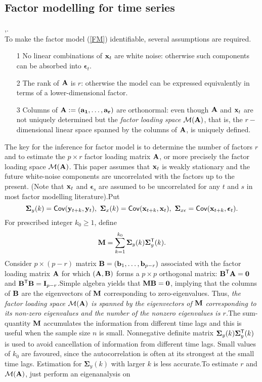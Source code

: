 \documentclass{statsoc}
\begin{document}
\subsection{Factor modelling for time series}
\citet{ly_fm12},\citet{lyb_fm11}.\\
To make the factor model (\ref{FM}) identifiable, several assumptions are required.
\begin{itemize}
\item[1] No linear combinations of ${\bf x}_t$ are white noise: otherwise such components can be absorbed into ${\bm \epsilon}_t$.
\item[2] The rank of $\bf A$ is $r$: otherwise the model can be expressed equivalently in terms of a lower-dimensional factor.
\item[3] Columns of $\bf A:=({\bf a}_1,\ldots,{\bf a}_r)$ are orthonormal: even though $\bf A$ and ${\bf x}_t$ are not uniquely determined but the {\it factor loading space} ${\cal M}({\bf A})$, that is, the $r-$dimensional linear space spanned by the columns of $\bf A$, is uniquely defined.
\end{itemize}
The key for the inference for factor model is to determine the number of factors $r$ and to estimate the $p\times r$ factor loading matrix $\bf A$, or more precisely the factor loading space ${\cal M}({\bf A})$.
This paper assumes that ${\bf x}_t$ is weakly stationary and the future white-noise components are uncorrelated with the factors up to the present. (Note that ${\bf x}_t$ and ${\bm\epsilon}_s$ are assumed to be uncorrelated for any $t$ and $s$ in most factor modelling literature).Put
\[{\bm\Sigma}_y(k)={\sf Cov}({\bf y}_{t+k},{\bf y}_t),~{\bm\Sigma}_x(k)={\sf Cov}({\bf x}_{t+k},{\bf x}_t),~{\bm \Sigma}_{x\epsilon}={\sf Cov}({\bf x}_{t+k},{\bm\epsilon}_{t}).\]
For prescribed integer $k_0\geq 1$, define
\[{\bf M}=\sum_{k=1}^{k_0}{\bm\Sigma}_y(k){\bm\Sigma}^{\sf T}_y(k).\]
Consider $p\times(p-r)$ matrix ${\bf B}=({\bf b}_1,\ldots,{\bf b}_{p-r})$ associated with the factor loading matrix $\bf A$ for which $({\bf A},{\bf B})$ forms a $p\times p$ orthogonal matrix: ${\bf B}^{\sf T}{\bf A}={\bf 0}$ and ${\bf B}^{\sf T}{\bf B}={\bf I}_{p-r}$.Simple algebra yields that ${\bf MB=0}$, implying that the columns of $\bf B$ are the eigenvectors of $\bf M$ corresponding to zero-eigenvalues. Thus, {\em the factor loading space ${\cal M}({\bf A})$ is spanned by the eigenvectors of $\bf M$ corresponding to its non-zero eigenvalues and the number of the nonzero eigenvalues is $r$.}The sum-quantity $\bf M$ accumulates the information from different time lags and this is useful when the sample size $n$ is small. Nonnegative definite matrix ${\bf \Sigma}_y(k){\bf\Sigma}^{\sf T}_y(k)$ is used to avoid cancellation of information from different time lags. Small values of $k_0$ are favoured, since the autocorrelation is often at its strongest at the small time lags. Estimation for ${\bm\Sigma}_y(k)$ with larger $k$ is less accurate.To estimate $r$ and ${\cal M}({\bf A})$, just perform an eigenanalysis on 
\end{document}
